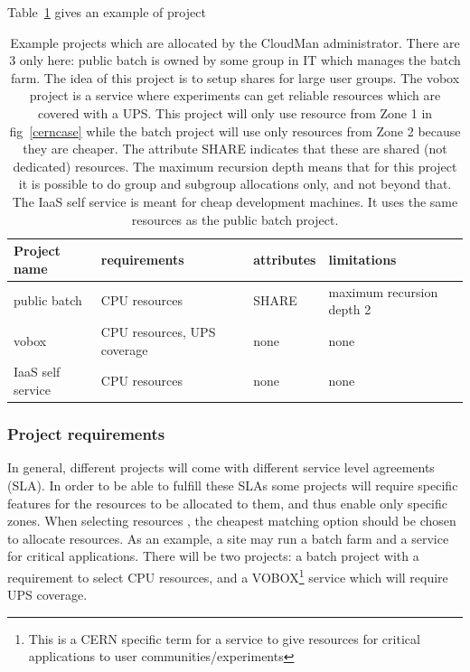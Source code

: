 Table~\ref{projects} gives an example of project 
\begin{table}[htb]
\begin{center}
\begin{tabular}{|l|l|l|l|}
\hline
Project name & requirements & attributes & limitations\\
\hline
public batch & CPU resources & SHARE & maximum recursion depth 2 \\
vobox & CPU resources, UPS coverage & none & none \\
IaaS self service & CPU resources & none & none \\
\hline
\end{tabular}
\end{center}
\caption{\label{projects}Example projects which are allocated by the CloudMan administrator. There are 3 only here: public batch is owned by some group in IT which manages the batch farm. The idea of this project is to setup shares for large user groups. The vobox project is a service where experiments can get reliable resources which are covered with a UPS. This project will only use resource from Zone 1 in fig~\ref{cerncase} while the batch project will use only resources from Zone 2 because they are cheaper. The attribute SHARE indicates that these are shared (not dedicated) resources. The maximum recursion depth means that for this project it is possible to do group and subgroup allocations only, and not beyond that. The IaaS self service is meant for cheap development machines. It uses the same resources as the public batch project.}
\end{table}

\subsubsection{Project requirements}
In general, different projects will come with different service level agreements (SLA). In order to be able to fulfill these SLAs some projects will require specific features for the resources to be allocated to them, and thus enable only specific zones. 
When selecting resources , the cheapest matching option should be chosen to allocate resources. 
As an example, a site may run a batch farm and a service for critical applications. There will be two projects: a batch project with a requirement to select CPU resources, and a VOBOX\footnote{This is a CERN specific term for a service to give resources for critical applications to user communities/experiments} service which will require UPS coverage. 


